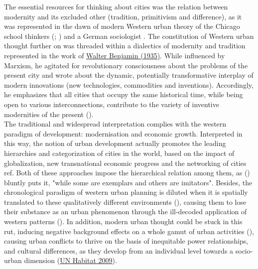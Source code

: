 \documentclass[11pt]{report}
\begin{document}
{{{The essential  resources  for  thinking  about  cities  was  the relation  between  modernity  and its  excluded  other  (tradition,  primitivism  and  difference),  as  it  was represented  in  the  dawn  of modern Western  urban  theory  of  the Chicago  school  thinkers  (\href{Park}{\citealt{park_human_1952}}; \href{Wirth}{\citealt{wirth_urbanism_1938}})
and a German sociologist \href{Simmel}{\cite{simmel_metropolis_1971}}.
The constitution of Western urban thought further on was threaded within a dialectics of modernity and tradition represented in the work of \href{Benjamin}{Walter Benjamin (1935)}.
While influenced by Marxism, he agitated 
for revolutionary consciousness about the problems of the present city and wrote about the dynamic, potentially transformative interplay of modern innovations (new technologies, commodities and inventions).
Accordingly, he emphasizes that all cities that occupy the same historical time, while being open  to  various  interconnections,  contribute  to  the  variety  of  inventive  modernities  of  the  present 
(\href{Robinson}{\citealt{robinson_ordinary_2006}}). 
\\

The traditional and widespread interpretation complies with the western paradigm of development: modernisation and economic growth.
Interpreted in this way, the notion of urban development actually promotes the leading hierarchies and categorization of cities in the world, based on the impact of globalization, new transnational economic progress and the networking of cities ref. Both of these approaches impose the hierarchical relation among them, as (\href{Robinson}{\citealt{robinson_ordinary_2006}}) bluntly puts it, "while some are exemplars and others are imitators".
Besides, the chronological paradigm of western urban planning is diluted when it is spatially translated to these qualitatively different environments (\href{Robinson}{\citealt{robinson_global_2002}}), causing them to lose their substance as an urban phenomenon through the ill-decoded application of western patterns (\href{Bolay}{\citealt{bolay_urban_2004}}). In addition, modern urban thought could be stuck in this rut, inducing negative background effects on a whole gamut of urban activities (\href{Amin}{\citealt{amin_ordinary_1997}}), causing urban conflicts to thrive on the basis of inequitable power relationships, and cultural differences, as they develop from an individual level towards a socio-urban dimension (\href{UN}{UN Habitat 2009}).
\\

}}}
\end{document}
